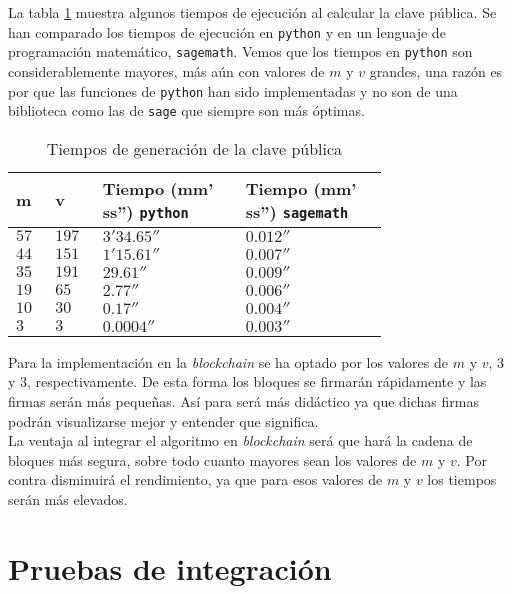 La tabla \ref{tab:tiempos} muestra algunos tiempos de ejecución al calcular la clave pública. Se han comparado los tiempos de ejecución en \texttt{python} y en un lenguaje de programación matemático, \texttt{sagemath}. Vemos que los tiempos en \texttt{python} son considerablemente mayores, más aún con valores de $m$ y $v$ grandes, una razón es por que las funciones de \texttt{python} han sido implementadas y no son de una biblioteca como las de \texttt{sage} que siempre son más óptimas.\\ 

\begin{table}[H]
	\begin{center}
		\begin{tabular}{p{0.07\linewidth}p{0.07\linewidth}p{0.3\linewidth}p{0.3\linewidth}}
			\textbf{m} & \textbf{v} & \textbf{Tiempo (mm' ss'')} \texttt{python} & \textbf{Tiempo (mm' ss'')} \texttt{sagemath}\\
			\toprule
				$57$ & $197$ & $3'34.65''$ & $0.012''$\\
				$44$ & $151$ & $1'15.61''$ & $0.007''$\\
				$35$ & $191$ & $29.61''$ & $0.009''$\\ 
				$19$ & $65$ & $2.77''$ & $0.006''$\\
				$10$ & $30$ & $0.17''$ & $0.004''$\\
				$3$ & $3$ & $0.0004''$ & $0.003''$\\
			\bottomrule
		\end{tabular}
	\end{center}
	\caption{Tiempos de generación de la clave pública}
	\label{tab:tiempos}
\end{table}

Para la implementación en la \textit{blockchain} se ha optado por los valores de $m$ y $v$, $3$ y $3$, respectivamente. De esta forma los bloques se firmarán rápidamente y las firmas serán más pequeñas. Así para será más didáctico ya que dichas firmas podrán visualizarse mejor y entender que significa.\\

La ventaja al integrar el algoritmo en \textit{blockchain} será que hará la cadena de bloques más segura, sobre todo cuanto mayores sean los valores de $m$ y $v$. Por contra disminuirá el rendimiento, ya que para esos valores de $m$ y $v$ los tiempos serán más elevados.\\

\section{Pruebas de integración}

